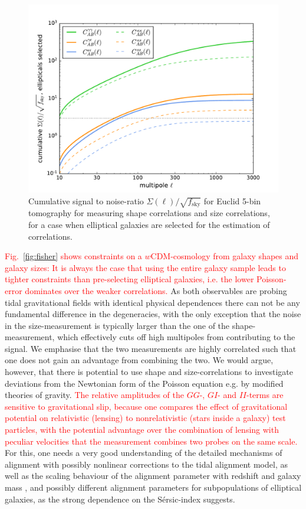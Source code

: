 \documentclass[a4paper,fleqn,usenatbib]{mnras}
\newcommand\spirou[1]{\textcolor{red}{#1}}
\begin{document}
\begin{figure}
\centering
\includegraphics[scale=0.45]{./figures/sigma_elliptical.pdf}
\caption{Cumulative signal to noise-ratio $\Sigma(\ell)/\sqrt{f_\mathrm{sky}}$ for Euclid 5-bin tomography for measuring shape correlations and size correlations, for a case when elliptical galaxies are selected for the estimation of correlations.}
\label{fig:s2n_elliptical}
\end{figure}

\spirou{Fig.~\ref{fig:fisher} shows constraints on a $w$CDM-cosmology from galaxy shapes and galaxy sizes: It is always the case that using the entire galaxy sample leads to tighter constraints than pre-selecting elliptical galaxies, i.e. the lower Poisson-error dominates over the weaker correlations.} As both observables are probing tidal gravitational fields with identical physical dependences there can not be any fundamental difference in the degeneracies, with the only exception that the noise in the size-measurement is typically larger than the one of the shape-measurement, which effectively cuts off high multipoles from contributing to the signal. We emphasise that the two measurements are highly correlated such that one does not gain an advantage from combining the two. We would argue, however, that there is potential to use shape and size-correlations to investigate deviations from the Newtonian form of the Poisson equation e.g. by modified theories of gravity. \spirou{The relative amplitudes of the $GG$-, $GI$- and $II$-terms are sensitive to gravitational slip, because one compares the effect of gravitational potential on relativistic (lensing) to nonrelativistic (stars inside a galaxy) test particles, with the potential advantage over the combination of lensing with peculiar velocities that the measurement combines two probes on the same scale.} For this, one needs a very good understanding of the detailed mechanisms of alignment with possibly nonlinear corrections to the tidal alignment model, as well as the scaling behaviour of the alignment parameter with redshift and galaxy mass \citep{hirata_intrinsic_2007}, and possibly different alignment parameters for subpopulations of elliptical galaxies, as the strong dependence on the S{\'e}rsic-index suggests. 
\end{document}
